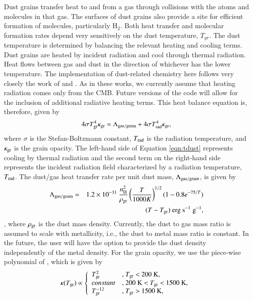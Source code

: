 Dust grains transfer heat to and from a gas through collisions
with the atoms and molecules in that gas.  The surfaces of dust grains
also provide a site for efficient formation of molecules, particularly
H$_{2}$.  Both heat transfer and molecular formation rates depend very
sensitively on the dust temperature, $T_{gr}$.  The dust temperature
is determined by balancing the relevant heating and cooling terms.
Dust grains are heated by incident radiation and cool through thermal
radiation.  Heat flows between gas and dust in the direction of
whichever has the lower temperature.  The implementation of
dust-related chemistry here follows very closely the work of
\citet{2000ApJ...534..809O} and \citet{2005ApJ...626..627O}.  As in
these works, we currently assume that heating radiation comes only
from the CMB.  Future versions of the code will allow for the
inclusion of additional radiative heating terms.  This heat balance
equation is, therefore, given by
\begin{equation} \label{eqn:tdust}
4 \sigma T_{\rm gr}^{4} \kappa_{\rm gr} = \Lambda_{\rm gas/grain} + 4 \sigma
T_{\rm rad}^{4} \kappa_{\rm gr},
\end{equation}
where $\sigma$ is the Stefan-Boltzmann constant, $T_{\rm rad}$ is the
radiation temperature, and $\kappa_{\rm gr}$ is the grain opacity.  The
left-hand side of Equation \ref{eqn:tdust} represents cooling by
thermal radiation and the second term on the right-hand side
represents the incident radiation field characterized by a radiation
temperature, $T_{\rm rad}$.  The dust/gas heat transfer rate per unit dust
mass, $\Lambda_{\rm gas/grain}$, is given by
\begin{eqnarray} \label{eqn:gasdust}
\Lambda_{\rm gas/grain} & = & 1.2\times10^{-31}~\frac{n_{\rm H}^{2}}{\rho_{\rm gr}}
\left(\frac{T}{1000 K}\right)^{1/2} (1 - 0.8 e^{-75 / T})  \nonumber \\
& & (T - T_{\rm gr})~\textrm{erg~s$^{-1}$~g$^{-1}$},
\end{eqnarray}
\citep{1989ApJ...342..306H}, where $\rho_{\rm gr}$ is the dust mass density.  Currently,
the dust to gas mass ratio is assumed to scale with metallicity, i.e.,
the dust to metal mass ratio is constant.  In the future, the user
will have the option to provide the dust density independently of the
metal density.  For the grain opacity, we use the piece-wise
polynomial of \citet{2011ApJ...729L...3D}, which is given by
\begin{equation}
\kappa(T_{\rm gr}) \propto \left\{ \begin{array}{ll}
T_{\rm gr}^{2} & \textrm{, $T_{\rm gr}$ $<$ 200~K,}\\
constant & \textrm{, 200~K $<$ $T_{\rm gr}$ $<$ 1500~K,}\\
T_{\rm gr}^{-12} & \textrm{, $T_{\rm gr}$ $>$ 1500~K},
\end{array} \right.
\end{equation}
